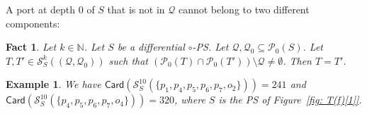 \documentclass{article}
\theoremstyle{plain}
\newtheorem{example}{Example}
\newtheorem{fact}[theorem]{Fact}
\newcommand{\Nat}{\ensuremath{\mathbb{N}}}
\newcommand{\nontrivialconnected}[3]{\mathcal{S}_{#1}^{#3}(#2)}
\newcommand{\connectedcomponents}[2]{\mathcal{C}^{#2}(#1)}
\newcommand{\portsatzero}[1]{\mathcal{P}_0(#1)}
\newcommand{\Card}[1]{\textsf{Card}\left( #1 \right)}
\newcommand{\conclusionscirc}[1]{\mathcal{P}_\circ^{\textsf{f}}(#1)}
\begin{document}
\begin{comment}
\begin{remark}
For any $\circ$-PS $S$, for any $T \in \connectedcomponents{S}{k}$, we have $\portsatzero{T} \setminus \conclusionscirc{T} \not= \emptyset$.
\end{remark}
\end{comment}

A port at depth $0$ of $S$ that is not in $\mathcal{Q}$ cannot belong to two different components:

\begin{fact}\label{fact: two components with a common port}
Let $k \in \Nat$. Let $S$ be a differential $\circ$-PS. Let $\mathcal{Q}, \mathcal{Q}_0 \subseteq \portsatzero{S}$. Let $T, T' \in \nontrivialconnected{S}{(\mathcal{Q}, \mathcal{Q}_0)}{k}$ such that $(\portsatzero{T} \cap \portsatzero{T'}) \setminus \mathcal{Q} \not= \emptyset$. Then $ T = T'$.
\end{fact}

\begin{comment}
\begin{proof}
By Remark~\ref{remark: substructures characterized by ports}, it is enough to prove $\portsatzero{T} = \portsatzero{T'}$.

Let $p \in (\portsatzero{T} \cap \portsatzero{T'}) \setminus \mathcal{P}$ and let $p' \in \portsatzero{T}$. There exists a finite sequence $(p_0, \ldots, p_n)$ of elements of $\portsatzero{T}$ such that
$p_0 = p$, $p_n = p'$ and\begin{itemize}
\item for any $j \in \{ 0, \ldots, n-1 \}$, we have $p_j \coh_S p_{j+1}$;
\item for any $j \in \{ 0, \ldots, n \}$, we have $p_j \in \mathcal{P} \Rightarrow (j = 0 \textit{ or } j = n))$.
\end{itemize}
We prove, by induction on $j$, that, for any $j \in \{ 0, \ldots, n \}$, we have $p_j \in \portsatzero{T'}$. By assumption, we have $p_0 \in \portsatzero{T'}$. Now, assume that $j \in \{ 0, \ldots, n-1 \}$ and $p_j \in \portsatzero{T'}$. We have $p_j \coh_S p_{j+1}$, hence $p_{j+1} \notin \portsatzero{T'} \Rightarrow p_j \in \mathcal{P}$. But we have $p_0 \notin \mathcal{P}$ and $j \not= n$, so $p_{j+1} \in \portsatzero{T'}$.
\end{proof}
\end{comment}

\begin{example}
We have $\Card{\nontrivialconnected{S}{\{ p_1, p_4, p_5, p_6, p_7, o_2 \}}{10}} = 241$ and $\Card{\nontrivialconnected{S}{\{ p_4, p_5, p_6, p_7, o_4 \}}{10}} = 320$, where $S$ is the PS of Figure~\ref{fig: T(f)[1]}.
\end{example}
\end{document}
